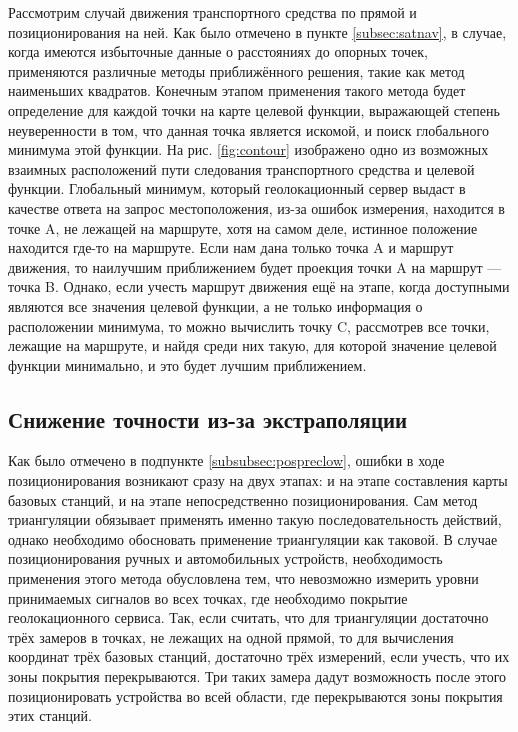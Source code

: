 Рассмотрим случай движения транспортного средства по прямой и позиционирования на ней. Как было отмечено в пункте \ref{subsec:satnav}, в случае, когда имеются избыточные данные о расстояниях до опорных точек, применяются различные методы приближённого решения, такие как метод наименьших квадратов. Конечным этапом применения такого метода будет определение для каждой точки на карте целевой функции, выражающей степень неуверенности в том, что данная точка является искомой, и поиск глобального минимума этой функции\cite{enwikiols}. На рис. \ref{fig:contour} изображено одно из возможных взаимных расположений пути следования транспортного средства и целевой функции. Глобальный минимум, который геолокационный сервер выдаст в качестве ответа на запрос местоположения, из-за ошибок измерения, находится в точке A, не лежащей на маршруте, хотя на самом деле, истинное положение находится где-то на маршруте. Если нам дана только точка A и маршрут движения, то наилучшим приближением будет проекция точки A на маршрут --- точка B. Однако, если учесть маршрут движения ещё на этапе, когда доступными являются все значения целевой функции, а не только информация о расположении минимума, то можно вычислить точку C, рассмотрев все точки, лежащие на маршруте, и найдя среди них такую, для которой значение целевой функции минимально, и это будет лучшим приближением.

\subsection{Снижение точности из-за экстраполяции}
\label{subsec:extralowprec}
Как было отмечено в подпункте \ref{subsubsec:pospreclow}, ошибки в ходе позиционирования возникают сразу на двух этапах: и на этапе составления карты базовых станций, и на этапе непосредственно позиционирования. Сам метод триангуляции обязывает применять именно такую последовательность действий, однако необходимо обосновать применение триангуляции как таковой. В случае позиционирования ручных и автомобильных устройств, необходимость применения этого метода обусловлена тем, что невозможно измерить уровни принимаемых сигналов во всех точках, где необходимо покрытие геолокационного сервиса. Так, если считать, что для триангуляции достаточно трёх замеров в точках, не лежащих на одной прямой, то для вычисления координат трёх базовых станций, достаточно трёх измерений, если учесть, что их зоны покрытия перекрываются. Три таких замера дадут возможность после этого позиционировать устройства во всей области, где перекрываются зоны покрытия этих станций.

